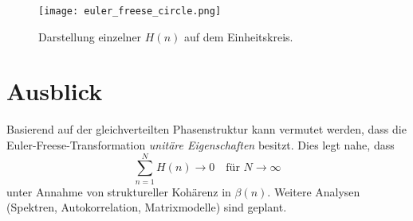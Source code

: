 \documentclass[a4paper,12pt]{article}
\begin{document}
\begin{figure}[H]
    \centering
    \texttt{[image: euler\_freese\_circle.png]}
    \caption{Darstellung einzelner \( H(n) \) auf dem Einheitskreis.}
\end{figure}

\section{Ausblick}

Basierend auf der gleichverteilten Phasenstruktur kann vermutet werden, dass die Euler-Freese-Transformation \emph{unitäre Eigenschaften} besitzt. Dies legt nahe, dass
\[
\sum_{n=1}^N H(n) \rightarrow 0 \quad \text{für } N \to \infty
\]
unter Annahme von struktureller Kohärenz in \(\beta(n)\). Weitere Analysen (Spektren, Autokorrelation, Matrixmodelle) sind geplant.
\end{document}
